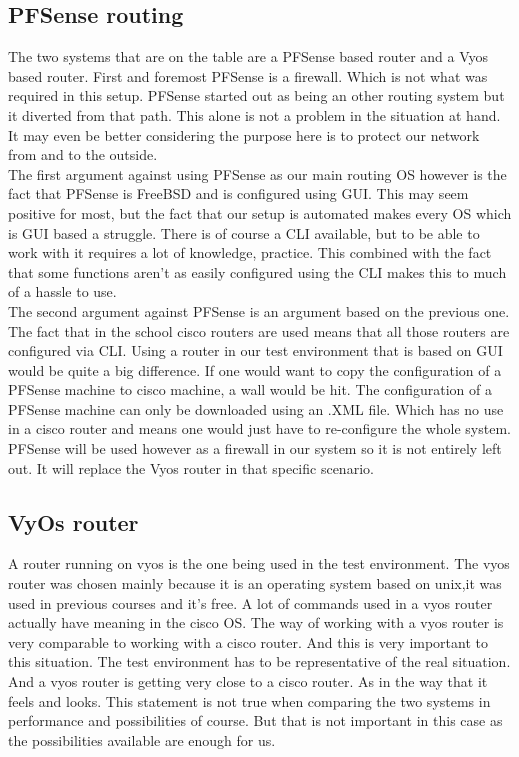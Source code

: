 \subsection { PFSense routing }
The two systems that are on the table are a PFSense based router and a Vyos based router. First and foremost PFSense is a firewall. Which is not what was required in this setup. PFSense started out as being an other routing system but it diverted from that path. This alone is not a problem in the situation at hand. It may even be better considering the purpose here is to protect our network from and to the outside. \\
The first argument against using PFSense as our main routing OS however is the fact that PFSense is FreeBSD and is configured using GUI. This may seem positive for most, but the fact that our setup is automated makes every OS which is GUI based a struggle. There is of course a CLI available, but to be able to work with it requires a lot of knowledge, practice. This combined with the fact that some functions aren't as easily configured using the CLI makes this to much of a hassle to use. \\
The second argument against PFSense is an argument based on the previous one. The fact that in the school cisco routers are used means that all those routers are configured via CLI. Using a router in our test environment that is based on GUI would be quite a big difference. If one would want to copy the configuration of a PFSense machine to cisco machine, a wall would be hit. The configuration of a PFSense machine can only be downloaded using an .XML file. Which has no use in a cisco router and means one would just have to re-configure the whole system. PFSense will be used however as a firewall in our system so it is not entirely left out. It will replace the Vyos router in that specific scenario.
\subsection { VyOs router }
A router running on vyos is the one being used in the test environment. The vyos router was chosen mainly because it is an operating system based on unix,it was used in previous courses  and it's free.
A lot of commands used in a vyos router actually have meaning in the cisco OS. The way of working with a vyos router is very comparable to working with a cisco router. And this is very important  to this situation. The test environment has to be representative of the real situation. And a vyos router is getting very close to a cisco router. As in the way that it feels and looks. This statement is not true when comparing the two systems in performance and possibilities of course. But that is not important in this case as the possibilities available are enough for us.


